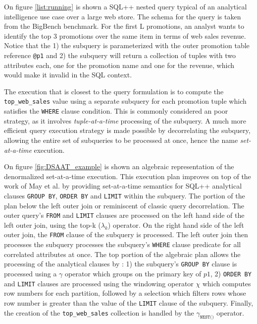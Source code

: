 \begin{minipage}{\linewidth}

\end{minipage}

On figure \ref{list:running} is shown a SQL++ nested query typical of an analytical intelligence use case over a large web store. The schema for the query is taken from the BigBench \cite{ghazal:2013aa} benchmark. For the first L promotions, an analyst wants to identify the top 3 promotions over the same item in terms of web sales revenue. Notice that the 1) the subquery is parameterized with the outer promotion table reference \texttt{@p1} and 2) the subquery will return a collection of tuples with two attributes each, one for the promotion name and one for the revenue, which would make it invalid in the SQL context. 

The execution that is closest to the query formulation is to compute the \texttt{top\_web\_sales} value using a separate subquery for each promotion tuple which satisfies the \texttt{WHERE} clause condition. This is commonly considered an poor strategy, as it involves \emph{tuple-at-a-time} processing of the subquery.  A much more efficient query execution strategy is made possible by decorrelating the subquery, allowing the entire set of subqueries to be processed at once, hence the name \emph{set-at-a-time} execution.


On figure \ref{fig:DSAAT_example} is shown an algebraic representation of the denormalized set-at-a-time execution. This execution plan improves on top of the work of May et al. \cite{may:2003aa} by providing set-at-a-time semantics for SQL++ analytical clauses \texttt{GROUP BY}, \texttt{ORDER BY} and \texttt{LIMIT} within the subquery. The portion of the plan below the left outer join or reminiscent of classic query decorrelation. The outer query's \texttt{FROM} and \texttt{LIMIT} clauses are processed on the left hand side of the left outer join, using the top-k ($\lambda_k$) operator. On the right hand side of the left outer join, the \texttt{FROM} clause of the subquery is processed. The left outer join then processes the subquery processes the subquery's \texttt{WHERE} clause predicate for all correlated attributes at once. The top portion of the algebraic plan allows the processing of the analytical clauses by : 1) the subquery's \texttt{GROUP BY} clause is processed using a $\gamma$ operator which groups on the primary key of $p1$, 2) \texttt{ORDER BY} and \texttt{LIMIT} clauses are processed using the windowing operator $\chi$ which computes row numbers for each partition, followed by a selection which filters rows whose row number is greater than the value of the \texttt{LIMIT} clause of the subquery. Finally, the creation of the \texttt{top\_web\_sales} collection is handled by the $\gamma_{\texttt{NEST()}}$ operator.

